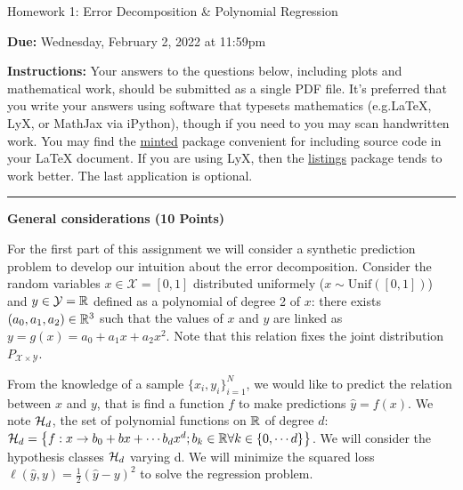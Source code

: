 \documentclass{article}
\newcommand{\bb}{b}
\newcommand{\ruleskip}{\bigskip\hrule\bigskip}
\begin{document}
\pagestyle{myheadings} 

\begin{center}
{\Large
Homework 1: Error Decomposition \& Polynomial Regression
} 
\end{center}

{
{ \color{nyupurple} \textbf{Due:} Wednesday, February 2, 2022 at 11:59pm} 
} 

\textbf{Instructions: }Your answers to the questions below, including plots and mathematical
 work, should be submitted as a single PDF file.  It's preferred that you write your answers using software that typesets mathematics (e.g.LaTeX, LyX, or MathJax via iPython), though if you need to you may scan handwritten work.  You may find the \href{https://github.com/gpoore/minted}{minted} package convenient for including source code in your LaTeX document.  If you are using LyX, then the \href{https://en.wikibooks.org/wiki/LaTeX/Source_Code_Listings}{listings} package tends to work better. The last application is optional. 

 \ruleskip

\textbf{\color{nyupurple} General considerations (10 Points)}

For the first part of this assignment we will consider a synthetic prediction problem to develop our intuition about the error decomposition. Consider the random variables $x \in \mathcal{X} = [0,1]$ distributed uniformely ($ x \sim \mathrm{Unif}([0,1])$) and $y \in \mathcal{Y} = {\mathbb{R}}$ defined as a polynomial of degree 2 of $x$: there exists $(a_0, a_1, a_2) \in {\mathbb{R}}^3$ such that the values of $x$ and $y$ are linked as $y = g(x) = a_0 + a_1 x + a_2 x^2$. Note that this relation fixes the joint distribution $P_{\mathcal{X} \times \mathcal{Y}}$.

From the knowledge of a sample $\{x_i, y_i\}_{i=1}^N$, we would like to predict the relation between $x$ and $y$, that is find a function $f$ to make predictions $\hat{y} = f(x)$. We note ${\mathcal{H}}_d$, the set of polynomial functions on $\mathbb{R}$ of degree $d$: $\gH_d = \left\{f: x \rightarrow \bb_0 + \bb x + \cdots \bb_d x^d; \bb_k \in \sR \forall k\in \{0, \cdots d\} \right\}$. We will consider the hypothesis classes ${\mathcal{H}}_d$ varying d.
We will minimize the squared loss $\ell(\hat{y},y) = \frac 1 2 (\hat{y} - y)^2$ to solve the regression problem.
\end{document}
